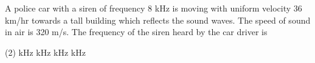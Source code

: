 
\item A police car with a siren of frequency 8 kHz is moving with uniform velocity 36 km/hr towards a tall building which reflects the sound waves. The speed of sound in air is 320 m/s. The frequency of the siren heard by the car driver is
    \begin{tasks}(2)
         kHz
         kHz
         kHz
         kHz
    \end{tasks}
